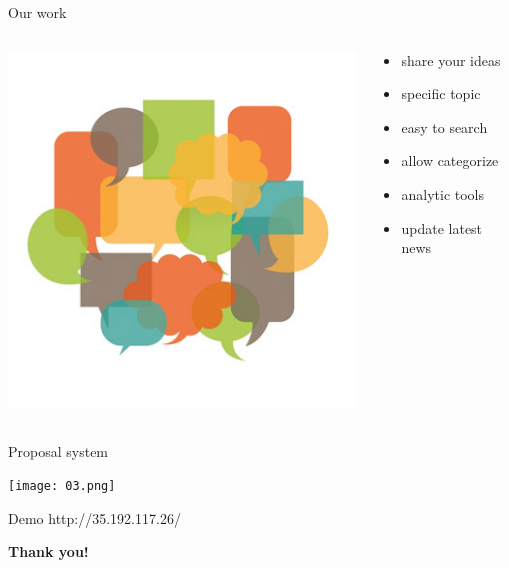 \documentclass{beamer}
\begin{document}
\begin{frame}{Our work}
\begin{columns}
	\begin{column}{0.5\textwidth}
		\includegraphics[scale=0.4]{02.jpg}
	\end{column}
	\begin{column}{0.5\textwidth}
		\begin{itemize}
			\item share your ideas
			\item specific topic
			\item easy to search
			\item allow categorize
			\item analytic tools
			\item update latest news 
		\end{itemize}
	\end{column}
\end{columns}
\end{frame}

\begin{frame}{Proposal system}
	\begin{center}
		\texttt{[image: 03.png]}
	\end{center}
\end{frame}

\begin{frame}{Demo}
	\centering http://35.192.117.26/
\end{frame}

\begin{frame}
	\centering \huge \textbf{Thank you!}
\end{frame}
\end{document}
